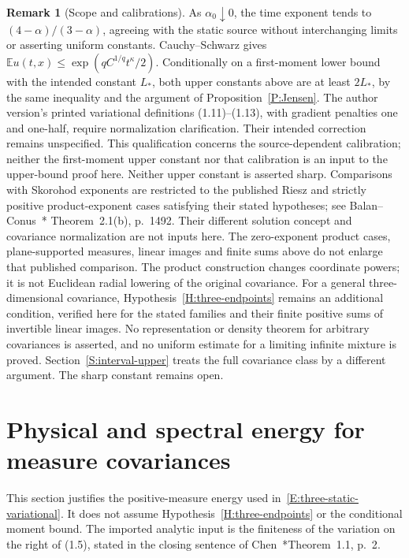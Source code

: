 \documentclass[12pt]{article}
\numberwithin{equation}{section}
\theoremstyle{definition}
\newtheorem{remark}[theorem]{Remark}
\newcommand{\E}{\mathbb{E}}
\begin{document}
\begin{remark}[Scope and calibrations]\label{R:three-endpoint-scope}
  As $\alpha_0\downarrow0$, the time exponent tends to
  $(4-\alpha)/(3-\alpha)$, agreeing with the static source without
  interchanging limits or asserting uniform constants. Cauchy--Schwarz gives
  $\E u(t,x)\le\exp(qC^{1/q}t^\kappa/2)$. Conditionally on a
  first-moment lower bound with the intended constant $L_*$, both
  upper constants above are at least $2L_*$, by the same inequality
  and the argument of Proposition~\ref{P:Jensen}. The author version's
  printed variational definitions (1.11)--(1.13), with gradient
  penalties one and one-half, require normalization clarification.
  Their intended correction remains unspecified. This
  qualification concerns the source-dependent calibration; neither
  the first-moment upper constant nor that calibration is an input
  to the upper-bound proof here. Neither upper constant is asserted sharp.
  Comparisons
  with Skorohod exponents are restricted to the published Riesz and
  strictly positive product-exponent cases satisfying their stated
  hypotheses; see Balan--Conus~\cite{balan.conus:16:intermittency}*{
  Theorem~2.1(b), p.~1492}. Their different solution concept and
  covariance normalization are not inputs here. The zero-exponent
  product cases, plane-supported measures, linear images and finite
  sums above do not enlarge that published comparison. The product
  construction changes coordinate powers; it is not Euclidean radial
  lowering of the original covariance. For a general three-dimensional
  covariance, Hypothesis~\ref{H:three-endpoints} remains an additional
  condition, verified here for the stated families and their finite
  positive sums of invertible linear images. No representation or
  density theorem for arbitrary covariances is asserted, and no
  uniform estimate for a limiting infinite mixture is proved.
  Section~\ref{S:interval-upper} treats the full covariance class by
  a different argument. The sharp constant remains open.
\end{remark}

\section{Physical and spectral energy for measure covariances}
\label{S:energy-fidelity}

This section justifies the positive-measure energy used
in~\eqref{E:three-static-variational}. It does not assume
Hypothesis~\ref{H:three-endpoints} or the conditional moment bound.
The imported analytic input is the finiteness of the variation on the
right of (1.5), stated in the closing sentence of
Chen~\cite{chen:23:exponential}*{Theorem~1.1, p.~2}.
\end{document}
